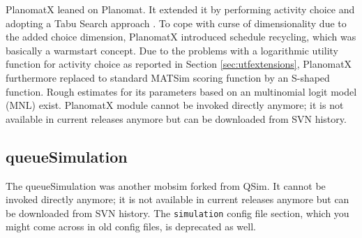 PlanomatX leaned on Planomat. It extended it by performing activity choice and adopting a Tabu Search approach \citep[][]{Feil_PhDThesis_2010}. To cope with curse of dimensionality due to the added choice dimension, PlanomatX introduced schedule recycling, which was basically a warmstart concept. Due to the problems with a logarithmic utility function for activity choice as reported in Section \ref{sec:utfextensions}, PlanomatX furthermore replaced to standard MATSim scoring function by an S-shaped function. Rough estimates for its parameters based on an multinomial logit model (MNL) exist. PlanomatX module cannot be invoked directly anymore; it is not available in current releases anymore but can be downloaded from SVN history.

\subsection{queueSimulation}
\label{sec:queueSimulation}
The queueSimulation was another mobsim forked from QSim. It cannot be invoked directly anymore; it is not available in current releases anymore but can be downloaded from SVN history. The \lstinline|simulation| config file section, which you might come across in old config files, is deprecated as well. 


